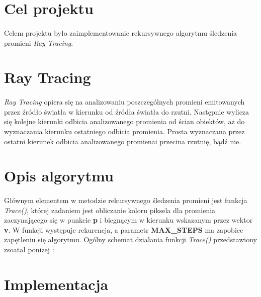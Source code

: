 \documentclass[wide,a4paper,titlepage,12pt] {article}
\begin{document}

\section{Cel projektu}
\paragraph{}
Celem projektu było zaimplementowanie rekursywnego algorytmu śledzenia promieni \textit{Ray Tracing}. 

\section{Ray Tracing}
\paragraph{}
\textit{Ray Tracing} opiera się na analizowaniu poszczególnych promieni emitowanych przez źródło światła w kierunku od źródła światła do rzutni. Następnie wylicza się kolejne kierunki odbicia analizowanego promienia od ścian obiektów, aż do wyznaczania kierunku ostatniego odbicia promienia. Prosta wyznaczana przez ostatni kierunek odbicia analizowanego promienai przecina rzutnię, bądź nie.

\section{Opis algorytmu}
\paragraph{}
Głównym elementem w metodzie rekursywnego śledzenia promieni jest funkcja \textit{Trace()}, której zadaniem jest obliczanie koloru piksela dla promienia zaczynającego się w punkcie \textbf{p} i biegnącym w kierunku wskazanym przez wektor \textbf{v}. W funkcji występuje rekurencja, a parametr \textbf{MAX\_STEPS} ma zapobiec zapętleniu się algorytmu. Ogólny schemat działania funkcji \textit{Trace()} przedstawiony zsoatał poniżej : 

\section{Implementacja}
\end{document}
